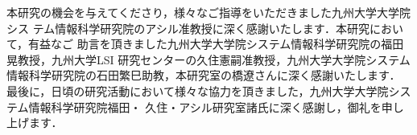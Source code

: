 \acknowledgment

本研究の機会を与えてくださり，様々なご指導をいただきました九州大学大学院シス
テム情報科学研究院のアシル准教授に深く感謝いたします．本研究において，有益なご
助言を頂きました九州大学大学院システム情報科学研究院の福田晃教授，九州大学LSI
研究センターの久住憲嗣准教授，九州大学大学院システム情報科学研究院の石田繁巳助教，本研究室の橋遼さんに深く感謝いたします．
最後に，日頃の研究活動において様々な協力を頂きました，九州大学大学院システム情報科学研究院福田・
久住・アシル研究室諸氏に深く感謝し，御礼を申し上げます．


\newpage
